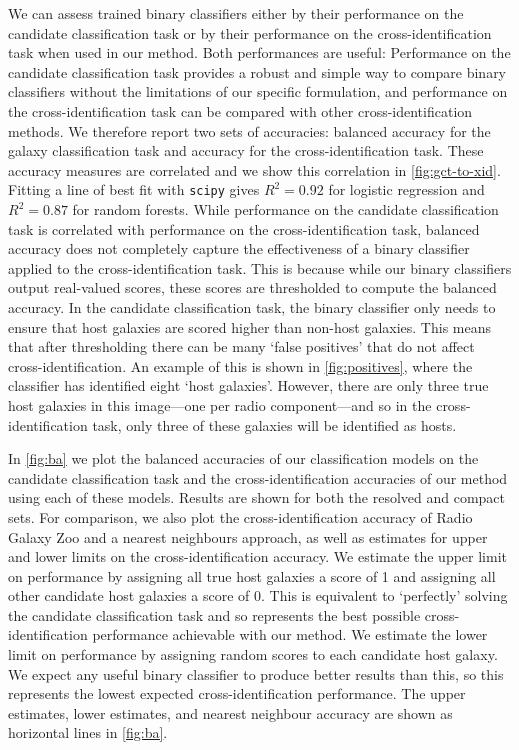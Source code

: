     {We can assess trained binary classifiers either by their performance on
    the candidate classification task or by their performance on the
    cross-identification task when used in our method. Both performances are
    useful: Performance on the candidate classification task provides a robust
    and simple way to compare binary classifiers without the limitations of
    our specific formulation, and performance on the cross-identification task
    can be compared with other cross-identification methods. We therefore
    report two sets of accuracies: balanced accuracy for the galaxy
    classification task and accuracy for the cross-identification task. These
    accuracy measures are correlated and we show this correlation in
    \autoref{fig:gct-to-xid}. Fitting a line of best fit with \texttt{scipy}
    gives $R^2 = 0.92$ for logistic regression and $R^2 = 0.87$ for random
    forests. While performance on the candidate classification task is correlated
    with performance on the cross-identification task, balanced accuracy does
    not completely capture the effectiveness of a binary classifier applied to
    the cross-identification task. {This is because while our binary
    classifiers output real-valued scores, these scores are thresholded to
    compute the balanced accuracy}. In the candidate classification
    task, the binary classifier only needs to ensure that host galaxies are
    {scored higher} than non-host galaxies. This means
    {that after thresholding} there can be
    many `false positives' that do not affect cross-identification. An example
    of this is shown in \autoref{fig:positives}, where the classifier has
    identified eight `host galaxies'. However, there are only three true host
    galaxies in this image---one per radio component---and so in the
    cross-identification task, only three of these galaxies will be identified
    as hosts.}

    In \autoref{fig:ba} we plot {the balanced accuracies of our classification models
    on the candidate classification task and the cross-identification
    accuracies of our method using each of these models. Results are shown for both
    the resolved and compact sets.} For comparison, we also plot the cross-identification accuracy of Radio Galaxy
    Zoo and a nearest neighbours approach, as well as estimates for upper and
    lower limits on the cross-identification accuracy. {We estimate the upper limit on performance by assigning all
    true host galaxies a score of 1 and
    assigning all other candidate host galaxies a score of 0. This
    is equivalent to `perfectly' solving the candidate classification task and so
    represents the best possible cross-identification performance achievable
    with our method. We estimate the lower limit on performance by {
    assigning random scores to each candidate host galaxy}. We expect any
    useful binary classifier to produce better
    results than this, so this represents the lowest expected
    cross-identification performance.} The upper estimates, lower estimates,
    and nearest neighbour accuracy are shown as horizontal lines in
    \autoref{fig:ba}.

